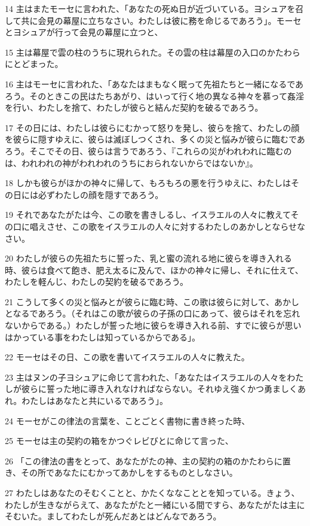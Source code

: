 \par 14 主はまたモーセに言われた、「あなたの死ぬ日が近づいている。ヨシュアを召して共に会見の幕屋に立ちなさい。わたしは彼に務を命じるであろう」。モーセとヨシュアが行って会見の幕屋に立つと、
\par 15 主は幕屋で雲の柱のうちに現れられた。その雲の柱は幕屋の入口のかたわらにとどまった。
\par 16 主はモーセに言われた、「あなたはまもなく眠って先祖たちと一緒になるであろう。そのときこの民はたちあがり、はいって行く地の異なる神々を慕って姦淫を行い、わたしを捨て、わたしが彼らと結んだ契約を破るであろう。
\par 17 その日には、わたしは彼らにむかって怒りを発し、彼らを捨て、わたしの顔を彼らに隠すゆえに、彼らは滅ぼしつくされ、多くの災と悩みが彼らに臨むであろう。そこでその日、彼らは言うであろう、『これらの災がわれわれに臨むのは、われわれの神がわれわれのうちにおられないからではないか』。
\par 18 しかも彼らがほかの神々に帰して、もろもろの悪を行うゆえに、わたしはその日には必ずわたしの顔を隠すであろう。
\par 19 それであなたがたは今、この歌を書きしるし、イスラエルの人々に教えてその口に唱えさせ、この歌をイスラエルの人々に対するわたしのあかしとならせなさい。
\par 20 わたしが彼らの先祖たちに誓った、乳と蜜の流れる地に彼らを導き入れる時、彼らは食べて飽き、肥え太るに及んで、ほかの神々に帰し、それに仕えて、わたしを軽んじ、わたしの契約を破るであろう。
\par 21 こうして多くの災と悩みとが彼らに臨む時、この歌は彼らに対して、あかしとなるであろう。（それはこの歌が彼らの子孫の口にあって、彼らはそれを忘れないからである。）わたしが誓った地に彼らを導き入れる前、すでに彼らが思いはかっている事をわたしは知っているからである」。
\par 22 モーセはその日、この歌を書いてイスラエルの人々に教えた。
\par 23 主はヌンの子ヨシュアに命じて言われた、「あなたはイスラエルの人々をわたしが彼らに誓った地に導き入れなければならない。それゆえ強くかつ勇ましくあれ。わたしはあなたと共にいるであろう」。
\par 24 モーセがこの律法の言葉を、ことごとく書物に書き終った時、
\par 25 モーセは主の契約の箱をかつぐレビびとに命じて言った、
\par 26 「この律法の書をとって、あなたがたの神、主の契約の箱のかたわらに置き、その所であなたにむかってあかしをするものとしなさい。
\par 27 わたしはあなたのそむくことと、かたくななこととを知っている。きょう、わたしが生きながらえて、あなたがたと一緒にいる間ですら、あなたがたは主にそむいた。ましてわたしが死んだあとはどんなであろう。

